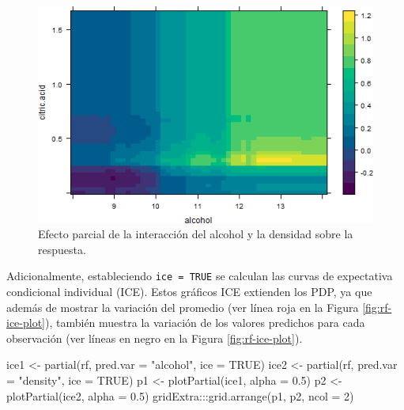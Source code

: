 \documentclass[
]{book}
\newenvironment{Shaded}{\begin{snugshade}}{\end{snugshade}}
\newcommand{\AttributeTok}[1]{\textcolor[rgb]{0.77,0.63,0.00}{#1}}
\newcommand{\ConstantTok}[1]{\textcolor[rgb]{0.00,0.00,0.00}{#1}}
\newcommand{\DecValTok}[1]{\textcolor[rgb]{0.00,0.00,0.81}{#1}}
\newcommand{\FloatTok}[1]{\textcolor[rgb]{0.00,0.00,0.81}{#1}}
\newcommand{\FunctionTok}[1]{\textcolor[rgb]{0.00,0.00,0.00}{#1}}
\newcommand{\NormalTok}[1]{#1}
\newcommand{\OtherTok}[1]{\textcolor[rgb]{0.56,0.35,0.01}{#1}}
\newcommand{\SpecialCharTok}[1]{\textcolor[rgb]{0.00,0.00,0.00}{#1}}
\newcommand{\StringTok}[1]{\textcolor[rgb]{0.31,0.60,0.02}{#1}}
\theoremstyle{break}
\theoremstyle{nonumberplain}
\begin{document}
\begin{figure}[!htb]

{\centering \includegraphics[width=0.8\linewidth]{images/rf-pdp-1} 

}

\caption{Efecto parcial de la interacción del alcohol y la densidad sobre la respuesta.}\label{fig:rf-pdp-plot}
\end{figure}

Adicionalmente, estableciendo \texttt{ice\ =\ TRUE} se calculan las curvas de expectativa condicional individual (ICE). Estos gráficos ICE extienden los PDP, ya que además de mostrar la variación del promedio (ver línea roja en la Figura \ref{fig:rf-ice-plot}), también muestra la variación de los valores predichos para cada observación (ver líneas en negro en la Figura \ref{fig:rf-ice-plot}).

\begin{Shaded}
\begin{Highlighting}[]
\NormalTok{ice1 }\OtherTok{\textless{}{-}} \FunctionTok{partial}\NormalTok{(rf, }\AttributeTok{pred.var =} \StringTok{"alcohol"}\NormalTok{, }\AttributeTok{ice =} \ConstantTok{TRUE}\NormalTok{)}
\NormalTok{ice2 }\OtherTok{\textless{}{-}} \FunctionTok{partial}\NormalTok{(rf, }\AttributeTok{pred.var =} \StringTok{"density"}\NormalTok{, }\AttributeTok{ice =} \ConstantTok{TRUE}\NormalTok{)}
\NormalTok{p1 }\OtherTok{\textless{}{-}} \FunctionTok{plotPartial}\NormalTok{(ice1, }\AttributeTok{alpha =} \FloatTok{0.5}\NormalTok{)}
\NormalTok{p2 }\OtherTok{\textless{}{-}} \FunctionTok{plotPartial}\NormalTok{(ice2, }\AttributeTok{alpha =} \FloatTok{0.5}\NormalTok{)}
\NormalTok{gridExtra}\SpecialCharTok{:::}\FunctionTok{grid.arrange}\NormalTok{(p1, p2, }\AttributeTok{ncol =} \DecValTok{2}\NormalTok{)}
\end{Highlighting}
\end{Shaded}
\end{document}
